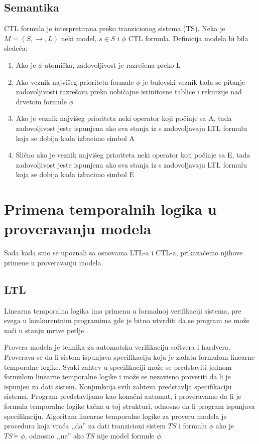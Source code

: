 \documentclass[a4paper]{article}
\begin{document}
{	\subsection{Semantika}
	\label{subsec:podnaslovN}
	CTL formula je interpretirana preko tranzicionog sistema (TS). Neka je $M = (S,\rightarrow, L)$ neki model, $s \in S$ i $\phi$ CTL formula.
	Definicija modela bi bila sledeća:
	\begin{enumerate}	
\item Ako je $\phi$ atomička, zadovoljivost je razrešena preko L
\item  Ako veznik najvišeg prioriteta formule $\phi$ je bulovski veznik tada se pitanje zadovoljivosti razrešava
		   preko uobičajne istinitosne tablice i rekurzije nad drvetom formule $\phi$
\item  Ako je veznik najvišeg prioriteta neki operator koji počinje sa A, tada zadovoljivost jeste ispunjena ako
		   sva stanja iz s zadovoljavaju LTL formulu koja se dobija kada izbacimo simbol A 
\item  Slično ako je veznik najvišeg prioriteta neki operator koji počinje sa E, tada zadovoljivost jeste ispunjena ako
		   sva stanja iz s zadovoljavaju LTL formulu koja se dobija kada izbacimo simbol E 
\end{enumerate}	

	\section{Primena temporalnih logika u proveravanju modela}
	\label{sec:MC}
	Sada kada smo se upoznali sa osnovama LTL-a i CTL-a, prikazaćemo njihove primene u proveravanju modela.
\subsection{LTL}
	\label{subsec:prLTL}
	Linearna temporalna logika ima primenu u formalnoj verifikaciji sistema, pre svega u konkurentnim programima gde je bitno utvrditi da se program ne može naći u stanju mrtve petlje \cite{baier2008principles}. 
	
	Provera modela je tehnika za automatsku verifikaciju softvera i hardvera. Proverava se da li sistem ispunjava specifikaciju koja je zadata formulom linearne temporalne logike. 
	Svaki zahtev u specifikaciji može se predstaviti jednom formulom linearne temporalne logike i može se nezavisno proveriti da li je ispunjen za dati sistem. Konjunkcija svih zahteva predstavlja specifikaciju sistema.
	Program predstavljamo kao konačni automat, i proveravamo da li je formula temporalne logike tačna u toj strukturi, odnosno da li program ispunjava specifikaciju.
	Algoritam linearne temporalne logike za proveru modela je procedura koja vraća ,,da'' za dati tranzicioni sistem $TS$ i formulu $\phi$ ako je $TS \vDash \phi$, odnosno ,,ne'' ako $TS$ nije model formule $\phi$.

}
\end{document}
